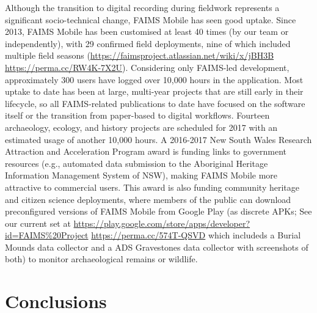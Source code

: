 \documentclass[preprint,12pt, a4paper]{elsarticle}
\begin{document}
Although the transition to digital recording during fieldwork represents a significant socio-technical change, FAIMS Mobile has seen good uptake. Since 2013, FAIMS Mobile has been customised at least 40 times (by our team or independently), with 29 confirmed field deployments, nine of which included multiple field seasons (\url{https://faimsproject.atlassian.net/wiki/x/jBH3B} \url{https://perma.cc/RW4K-7X2U}). Considering only FAIMS-led development, approximately 300 users have logged over 10,000 hours in the application. Most uptake to date has been at large, multi-year projects that are still early in their lifecycle, so all FAIMS-related publications to date have focused on the software itself or the transition from paper-based to digital workflows. Fourteen archaeology, ecology, and history projects are scheduled for 2017 with an estimated usage of another 10,000 hours. A 2016-2017 New South Wales Research Attraction and Acceleration Program award is funding links to government resources (e.g., automated data submission to the Aboriginal Heritage Information Management System of NSW), making FAIMS Mobile more attractive to commercial users. This award is also funding community heritage and citizen science deployments, where members of the public can download preconfigured versions of FAIMS Mobile from Google Play (as discrete APKs; See our current set at \url{https://play.google.com/store/apps/developer?id=FAIMS%20Project} \url{https://perma.cc/574T-QSVD} which includeds a Burial Mounds data collector and a ADS Gravestones data collector with screenshots of both) to monitor archaeological remains or wildlife.


\section{Conclusions}
\end{document}
